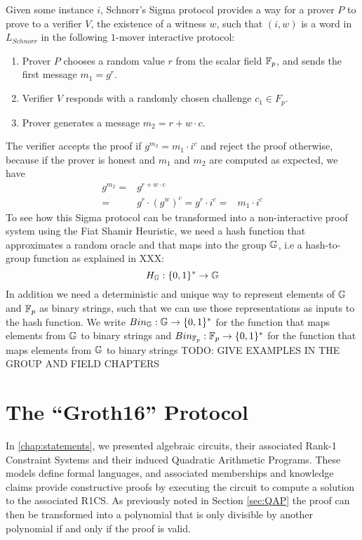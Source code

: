\begin{example}
Given some instance $i$, Schnorr's Sigma protocol provides a way for a prover $P$ to prove to a verifier $V$, the existence of a witness $w$, such that $(i,w)$ is a word in $L_{Schnorr}$  in the following $1$-mover interactive protocol:
\begin{enumerate}
\item Prover $P$ chooses a random value $r$ from the scalar field $\mathbb{F}_p$, and sends the first message $m_1=g^r$. 
\item Verifier $V$ responds with a randomly chosen challenge $c_1\in F_p$.
\item Prover generates a message $m_2=r+w\cdot c$.
\end{enumerate}
The verifier accepts the proof if $g^{m_2} = m_1\cdot i^c$ and reject the proof otherwise, because if the prover is honest and $m_1$ and $m_2$ are computed as expected, we have
\begin{align*}
g^{m_2} = & g^{r+w\cdot c} \\
        = & g^{r} \cdot (g^{w})^c = g^r \cdot i^c
        = &  m_1\cdot i^c
\end{align*}
To see how this Sigma protocol can be transformed into a non-interactive proof system using the Fiat Shamir Heuristic, we need a hash function that approximates a random oracle and that maps into the group $\mathbb{G}$, i.e a hash-to-group function as explained in XXX: 
$$
H_{\mathbb{G}}: \{0,1\}^* \to \mathbb{G}
$$
In addition we need a deterministic and unique way to represent elements of $\mathbb{G}$ and $\mathbb{F}_p$ as binary strings, such that we can use those representations as inputs to the hash function. We write $Bin_{\mathbb{G}}: \mathbb{G} \to \{0,1\}^*$ for the function that maps elements from $\mathbb{G}$ to binary strings and $Bin_{\mathbb{F}_p}: \mathbb{F}_p \to \{0,1\}^*$ for the function that maps elements from $\mathbb{G}$ to binary strings TODO: GIVE EXAMPLES IN THE GROUP AND FIELD CHAPTERS

\end{example}

\section{The ``Groth16'' Protocol}
\label{sec:gorth_16}
 In \chaptname{} \ref{chap:statements}, we presented algebraic circuits, their associated Rank-1 Constraint Systems and their induced Quadratic Arithmetic Programs. These models define formal languages, and associated memberships and knowledge claims provide constructive proofs by executing the circuit to compute a solution to the associated R1CS. As previously noted in Section \ref{sec:QAP} the proof can then be transformed into a polynomial that is only divisible by another polynomial if and only if the proof is valid. 
 
